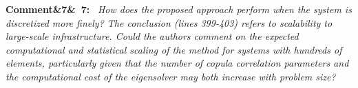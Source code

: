 \documentclass[11pt]{article}
\newenvironment{rcomment}[1]{\par\bigskip\noindent\textbf{Comment\ifx&#1&\else\ #1\fi:}\ \itshape}{\par}
\begin{document}
\begin{rcomment}{7}
How does the proposed approach perform when the system is discretized more finely? The conclusion (lines 399-403)
refers to scalability to large-scale infrastructure. Could the authors comment on the expected computational and  statistical scaling of the method for systems with hundreds of elements, particularly given that the number of copula correlation parameters and the computational cost of the eigensolver may both increase with problem size?
\end{rcomment}

%
\end{document}
